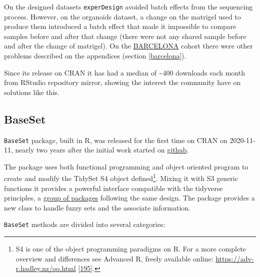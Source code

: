 \documentclass[
  12pt,
  a4paper,
  twoside,
  openright]{book}
\begin{document}
On the designed datasets \texttt{experDesign} avoided batch effects from the sequencing process.
However, on the organoids dataset, a change on the matrigel used to produce them introduced a batch effect that made it impossible to compare samples before and after that change (there were not any shared sample before and after the change of matrigel).
On the \protect\hyperlink{acronyms_BARCELONA}{BARCELONA} cohort there were other problems described on the appendices (section \ref{barcelona}).

Since its release on CRAN it has had a median of \textasciitilde400 downloads each month from RStudio repository mirror, showing the interest the community have on solutions like this.

\FloatBarrier

\hypertarget{baseset-1}{%
\subsection{BaseSet}\label{baseset-1}}

\texttt{BaseSet} package, built in R, was released for the first time on CRAN on 2020-11-11, nearly two years after the initial work started on \href{https://github.com/llrs/BaseSet}{github}.

The package uses both functional programming and object oriented program to create and modify the TidySet S4 object defined\footnote{S4 is one of the object programming paradigms on R.
  For a more complete overview and differences see Advanced R, freely available online: \url{https://adv-r.hadley.nz/oo.html} {[}\protect\hyperlink{ref-wickham2019}{195}{]}.}.
Mixing it with S3 generic functions it provides a powerful interface compatible with the tidyverse principles, a \href{https://www.tidyverse.org/}{group of packages} following the same design.
The package provides a new class to handle fuzzy sets and the associate information.

\texttt{BaseSet} methods are divided into several categories:
\end{document}
